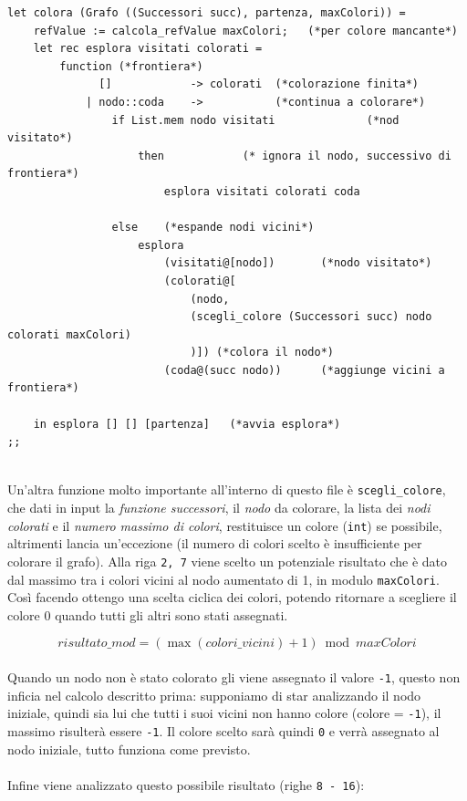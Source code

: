 \begin{lstlisting}[style=camlt, caption={Funzione che si occupa della colorazione di un grafo.}, label=colora]
let colora (Grafo ((Successori succ), partenza, maxColori)) =
	refValue := calcola_refValue maxColori;   (*per colore mancante*)
	let rec esplora visitati colorati = 
		function (*frontiera*)
		 	  []            -> colorati  (*colorazione finita*)
			| nodo::coda    ->           (*continua a colorare*)
				if List.mem nodo visitati              (*nod visitato*)
					then 			(* ignora il nodo, successivo di frontiera*)
						esplora visitati colorati coda  

				else 	(*espande nodi vicini*)
					esplora 
						(visitati@[nodo])       (*nodo visitato*)
						(colorati@[
							(nodo, 
							(scegli_colore (Successori succ) nodo colorati maxColori)
							)]) (*colora il nodo*)
						(coda@(succ nodo))      (*aggiunge vicini a frontiera*)

	in esplora [] [] [partenza]   (*avvia esplora*)
;;
\end{lstlisting}
\ \\
Un'altra funzione molto importante all'interno di questo file è \lstinline[style=cmd]|scegli_colore|, che dati in input la \textit{funzione successori}, il \textit{nodo} da colorare, la lista dei \textit{nodi colorati} e il \textit{numero massimo di colori}, restituisce un colore (\lstinline[style=cmd]|int|) se possibile, altrimenti lancia un'eccezione (il numero di colori scelto è insufficiente per colorare il grafo). Alla riga \lstinline[style=cmd]|2, 7| viene scelto un potenziale risultato che è dato dal massimo tra i colori vicini al nodo aumentato di 1, in modulo \lstinline[style=cmd]|maxColori|. Così facendo ottengo una scelta ciclica dei colori, potendo ritornare a scegliere il colore 0 quando tutti gli altri sono stati assegnati.

\[
	risultato\_mod = (\max(colori\_vicini) + 1) \bmod maxColori
\]
\ \\
Quando un nodo non è stato colorato gli viene assegnato il valore \lstinline[style=cmd]|-1|, questo non inficia nel calcolo descritto prima: supponiamo di star analizzando il nodo iniziale, quindi sia lui che tutti i suoi vicini non hanno colore (colore = \lstinline[style=cmd]|-1|), il massimo risulterà essere \lstinline[style=cmd]|-1|. Il colore scelto sarà quindi \lstinline[style=cmd]|0| e verrà assegnato al nodo iniziale, tutto funziona come previsto.\\
\ \\
Infine viene analizzato questo possibile risultato (righe \lstinline[style=cmd]|8 - 16|):

